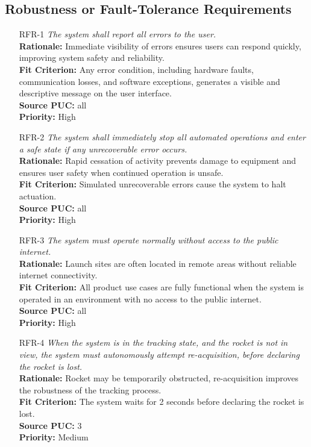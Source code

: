 \documentclass[12pt]{article}
\begin{document}
\subsection{Robustness or Fault-Tolerance Requirements}
\begin{itemize}[leftmargin=*]
  \item[RFR-1] \emph{The system shall report all errors to the user.}\\[2mm]
        \textbf{Rationale:} Immediate visibility of errors ensures users can respond quickly, improving system safety and reliability.\\
        \textbf{Fit Criterion:} Any error condition, including hardware faults, communication losses, and software exceptions, generates a visible and descriptive message on the user interface.\\
        \textbf{Source PUC:} all \\
        \textbf{Priority:} High
  \item[RFR-2] \emph{The system shall immediately stop all automated operations and
          enter a safe state if any unrecoverable error occurs.}\\[2mm]
        \textbf{Rationale:} Rapid cessation of activity prevents damage to equipment and ensures user safety when continued operation is unsafe.\\
        \textbf{Fit Criterion:} Simulated unrecoverable errors cause the system to halt actuation.\\
        \textbf{Source PUC:} all \\
        \textbf{Priority:} High
  \item[RFR-3] \emph{The system must operate normally without access to the public
          internet.}\\[2mm]
        \textbf{Rationale:} Launch sites are often located in remote areas without reliable internet connectivity.\\
        \textbf{Fit Criterion:} All product use cases are fully functional when the system is operated in an environment with no access to the public internet.\\
        \textbf{Source PUC:} all \\
        \textbf{Priority:} High
  \item[RFR-4] \emph{When the system is in the tracking state, and the rocket is not in
          view, the system must autonomously attempt re-acquisition, before declaring the
          rocket is lost.}\\[2mm]
        \textbf{Rationale:} Rocket may be temporarily obstructed, re-acquisition improves the robustness of the tracking process.\\
        \textbf{Fit Criterion:} The system waits for 2 seconds before declaring the rocket is lost.\\
        \textbf{Source PUC:} 3 \\
        \textbf{Priority:} Medium
\end{itemize}
\end{document}
